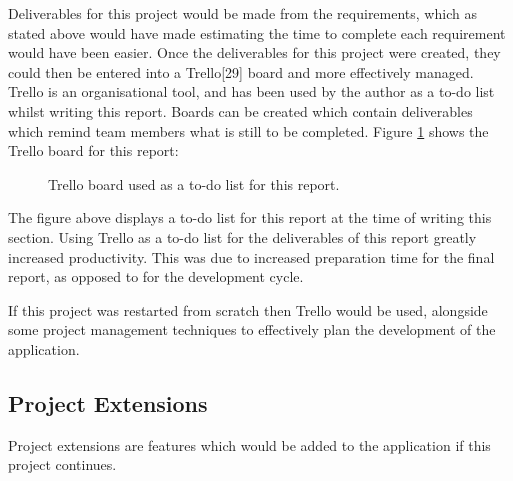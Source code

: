 \documentclass{article}
\begin{document}
Deliverables for this project would be made from the requirements, which as stated above would have made estimating the time to complete each requirement would have been easier. Once the deliverables for this project were created, they could then be entered into a Trello[29] board and more effectively managed. Trello is an organisational tool, and has been used by the author as a to-do list whilst writing this report. Boards can be created which contain deliverables which remind team members what is still to be completed. Figure \ref{figure:trelloBoard} shows the Trello board for this report: 

\begin{figure}[H]
	\centering
	\caption{Trello board used as a to-do list for this report.}
	\label{figure:trelloBoard}
\end{figure}

The figure above displays a to-do list for this report at the time of writing this section. Using Trello as a to-do list for the deliverables of this report greatly increased productivity. This was due to increased preparation time for the final report, as opposed to for the development cycle. \par

If this project was restarted from scratch then Trello would be used, alongside some project management techniques to effectively plan the development of the application. \par

\subsection{Project Extensions}

Project extensions are features which would be added to the application if this project continues. 
\end{document}
